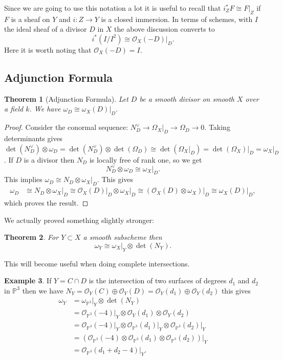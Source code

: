 \documentclass[12pt]{article}
\numberwithin{equation}{section}
\newtheorem{theorem}{Theorem}[subsection]
\theoremstyle{definition}
\newtheorem{example}[theorem]{Example}
\theoremstyle{remark}
\newcommand{\Ocal}{\mathcal{O}}
\newcommand{\PP}{\mathbb{P}}
\begin{document}
Since we are going to use this notation a lot it is useful to recall that $i_Z^* F\cong F\vert_Z$ if $F$ is a sheaf on $Y$ and $i:Z\to Y$ is a closed immersion. 
In terms of schemes, with $I$ the ideal sheaf of a divisor $D$ in $X$ the above discussion converts to 
 $$ i^*(I/I^2) \cong \Ocal_X(-D)\vert_D. $$
Here it is worth noting that $\Ocal_X(-D) = I$.

\subsection{Adjunction Formula}

\begin{theorem}[Adjunction Formula]
	Let $D$ be a smooth divisor on smooth $X$ over a field $k$. 
	We have $ \omega_D \cong \omega_X(D)\vert_D. $
\end{theorem}
\begin{proof}
	Consider the conormal sequence: $N_D^{\vee} \to \Omega_X\vert_D \to \Omega_D \to 0$. 
	Taking determinants gives $\det(N_D^{\vee}) \otimes\omega_D = \det(N_D^{\vee}) \otimes \det(\Omega_D) \cong \det(\Omega_X\vert_D) = \det(\Omega_X)\vert_D = \omega_X \vert_D$. 
	If $D$ is a divisor then $N_D$ is locally free of rank one, so we get 
	 $$ N_D^{\vee} \otimes \omega_D \cong \omega_X \vert_D.$$
	 This implies $\omega_D \cong N_D\otimes \omega_X\vert_D$.
	 This gives 
	  \begin{align*}
	  \omega_D &\cong N_D \otimes \omega_X\vert_D \cong \Ocal_X(D)\vert_D \otimes \omega_X \vert_D \cong (\Ocal_X(D)\otimes \omega_X)\vert_D\cong \omega_X(D)\vert_D,
	  \end{align*}
	  which proves the result.
\end{proof}

We actually proved something slightly stronger:
\begin{theorem}\label{thm:strong-adjunction}
	For $Y\subset X$ a smooth subscheme then 
	$$\omega_Y \cong \omega_X\vert_Y \otimes \det(N_Y).$$
\end{theorem}
This will become useful when doing complete intersections. 

\begin{example}
	If $Y=C\cap D$ is the intersection of two surfaces of degrees $d_1$ and $d_2$ in $\PP^3$ then we have $N_Y = \Ocal_Y(C)\oplus \Ocal_Y(D) = \Ocal_Y(d_1) \oplus \Ocal_Y(d_2)$ this gives
	\begin{align*} 
	 \omega_Y &= \omega_{\PP^3}\vert_Y \otimes \det(N_Y)\\
	 &= \Ocal_{\PP^3}(-4)\vert_Y \otimes \Ocal_Y(d_1) \otimes \Ocal_Y(d_2)\\
	 &=\Ocal_{\PP^3}(-4)\vert_Y \otimes \Ocal_{\PP^3}(d_1)\vert_Y \otimes \Ocal_{\PP^3}(d_2)\vert_Y\\
	 &=\left( \Ocal_{\PP^3}(-4)\otimes \Ocal_{\PP^3}(d_1)\otimes \Ocal_{\PP^3}(d_2)\right) \vert_Y \\
	 &= \Ocal_{\PP^3}(d_1+d_2-4) \vert_Y.
	 \end{align*} 
\end{example}
\end{document}
